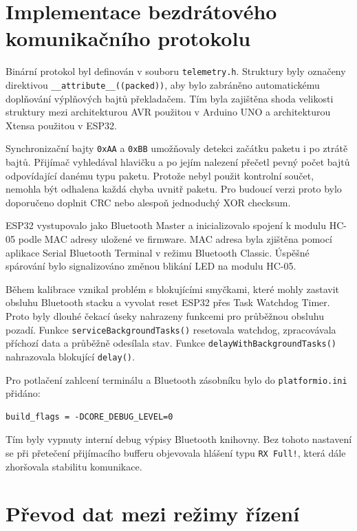 \section{Implementace bezdrátového komunikačního protokolu}
\label{sec:implementace-bt-protokolu}

Binární protokol byl definován v souboru \texttt{telemetry.h}. Struktury byly označeny direktivou \texttt{\_\_attribute\_\_((packed))}, aby bylo zabráněno automatickému doplňování výplňových bajtů překladačem. Tím byla zajištěna shoda velikosti struktury mezi architekturou AVR použitou v Arduino UNO a architekturou Xtensa použitou v ESP32.

Synchronizační bajty \texttt{0xAA} a \texttt{0xBB} umožňovaly detekci začátku paketu i po ztrátě bajtů. Přijímač vyhledával hlavičku a po jejím nalezení přečetl pevný počet bajtů odpovídající danému typu paketu. Protože nebyl použit kontrolní součet, nemohla být odhalena každá chyba uvnitř paketu. Pro budoucí verzi proto bylo doporučeno doplnit CRC nebo alespoň jednoduchý XOR checksum.

ESP32 vystupovalo jako Bluetooth Master a inicializovalo spojení k modulu HC-05 podle MAC adresy uložené ve firmware. MAC adresa byla zjištěna pomocí aplikace Serial Bluetooth Terminal v režimu Bluetooth Classic. Úspěšné spárování bylo signalizováno změnou blikání LED na modulu HC-05.

Během kalibrace vznikal problém s blokujícími smyčkami, které mohly zastavit obsluhu Bluetooth stacku a vyvolat reset ESP32 přes Task Watchdog Timer. Proto byly dlouhé čekací úseky nahrazeny funkcemi pro průběžnou obsluhu pozadí. Funkce \texttt{serviceBackgroundTasks()} resetovala watchdog, zpracovávala příchozí data a průběžně odesílala stav. Funkce \texttt{delayWithBackgroundTasks()} nahrazovala blokující \texttt{delay()}.

Pro potlačení zahlcení terminálu a Bluetooth zásobníku bylo do \texttt{platformio.ini} přidáno:

\begin{lstlisting}
build_flags = -DCORE_DEBUG_LEVEL=0
\end{lstlisting}

Tím byly vypnuty interní debug výpisy Bluetooth knihovny. Bez tohoto nastavení se při přetečení přijímacího bufferu objevovala hlášení typu \texttt{RX Full!}, která dále zhoršovala stabilitu komunikace.

\section{Převod dat mezi režimy řízení}
\label{sec:prevod-dat-rezimy}

